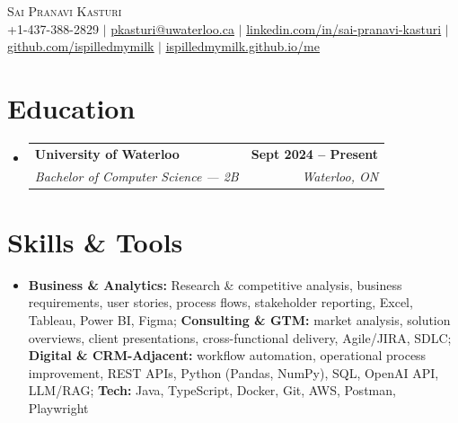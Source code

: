 \documentclass[letterpaper,10pt]{article}
\makeatletter
\newcommand{\resumeSubheading}[4]{
  \vspace{-1pt}\item
    \begin{tabular*}{1.0\textwidth}[t]{l@{\extracolsep{\fill}}r}
      \textbf{#1} & \textbf{\small #2} \\
      \textit{\small#3} & \textit{\small #4} \\[-2pt]
    \end{tabular*}\vspace{-7pt}
}
\newcommand{\resumeSubHeadingListStart}{\begin{itemize}[leftmargin=0.0in, label={}]}
\newcommand{\resumeSubHeadingListEnd}{\end{itemize}}
\makeatother
\begin{document}
\vspace{-20pt}
\begin{center}
    {\Huge \scshape Sai Pranavi Kasturi} \\
    \vspace{3pt}
    \small +1-437-388-2829 $|$ \underline{pkasturi@uwaterloo.ca} $|$
    \href{https://linkedin.com/in/sai-pranavi-kasturi-704807298}{\underline{linkedin.com/in/sai-pranavi-kasturi}} $|$
    \href{https://github.com/ispilledmymilk}{\underline{github.com/ispilledmymilk}} $|$
    \href{https://ispilledmymilk.github.io/me/}{\underline{ispilledmymilk.github.io/me}}
\end{center}
\vspace{-2pt}

\section{Education}
  \resumeSubHeadingListStart
    \resumeSubheading
      {University of Waterloo}{Sept 2024 -- Present}
      {Bachelor of Computer Science --- 2B}{Waterloo, ON}
  \resumeSubHeadingListEnd
\vspace{-6pt}

\section{Skills \& Tools}
\begin{itemize}[leftmargin=0.05in, label={}]
  \small\item{
    \textbf{Business \& Analytics:} Research \& competitive analysis, business requirements, user stories, process flows, stakeholder reporting, Excel, Tableau, Power BI, Figma; \textbf{Consulting \& GTM:} market analysis, solution overviews, client presentations, cross-functional delivery, Agile/JIRA, SDLC; \textbf{Digital \& CRM-Adjacent:} workflow automation, operational process improvement, REST APIs, Python (Pandas, NumPy), SQL, OpenAI API, LLM/RAG; \textbf{Tech:} Java, TypeScript, Docker, Git, AWS, Postman, Playwright
  }
\end{itemize}
\vspace{-6pt}
\end{document}
